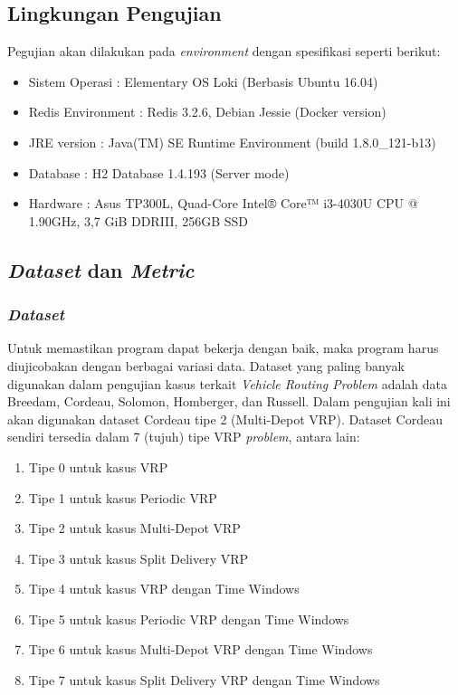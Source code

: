 \subsection{Lingkungan Pengujian}
Pegujian akan dilakukan pada \textit{environment} dengan spesifikasi seperti berikut: 
\begin{itemize}
\item Sistem Operasi		: Elementary OS Loki (Berbasis Ubuntu 16.04)
\item Redis Environment		: Redis 3.2.6, Debian Jessie (Docker version)
\item JRE version			: Java(TM) SE Runtime Environment (build 1.8.0\_121-b13)
\item Database				: H2 Database 1.4.193 (Server mode)
\item Hardware				: Asus TP300L, Quad-Core Intel® Core™ i3-4030U CPU @ 1.90GHz, 3,7 GiB DDRIII, 256GB SSD
\end{itemize}


\subsection{\textit{Dataset} dan \textit{Metric}}
\subsubsection{\textit{Dataset}}
Untuk memastikan program dapat bekerja dengan baik, maka program harus diujicobakan dengan berbagai variasi data. Dataset yang paling banyak digunakan dalam pengujian kasus terkait \textit{Vehicle Routing Problem} adalah data Breedam, Cordeau, Solomon, Homberger, dan Russell. Dalam pengujian kali ini akan digunakan dataset Cordeau tipe 2 (Multi-Depot VRP). Dataset Cordeau sendiri tersedia dalam 7 (tujuh) tipe VRP \textit{problem}, antara lain: 

\begin{enumerate}
\item Tipe 0 untuk kasus VRP
\item Tipe 1 untuk kasus Periodic VRP
\item Tipe 2 untuk kasus Multi-Depot VRP
\item Tipe 3 untuk kasus Split Delivery VRP
\item Tipe 4 untuk kasus VRP dengan Time Windows
\item Tipe 5 untuk kasus Periodic VRP dengan Time Windows
\item Tipe 6 untuk kasus Multi-Depot VRP dengan Time Windows
\item Tipe 7 untuk kasus Split Delivery VRP dengan Time Windows
\end{enumerate}


